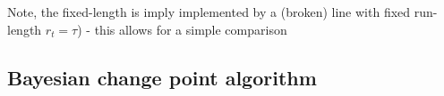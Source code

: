 \documentclass[profile,final,english, draft]{article}%
\begin{document}
Note, the fixed-length is imply implemented by a (broken) line with fixed run-length $r_t=\tau$) - this allows for a simple comparison 

\subsection{Bayesian change point algorithm}


% 
\end{document}
